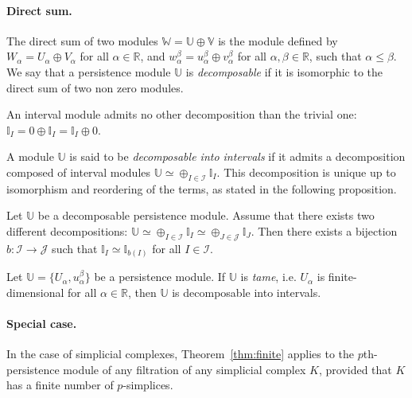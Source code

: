 
\paragraph*{Direct sum.}
The direct sum of two modules $\mathbb{W}=\mathbb{U}\oplus\mathbb{V}$ is the module 
defined by $W_{\alpha}=U_{\alpha}\oplus V_{\alpha}$ for all $\alpha\in\mathbb{R}$, and 
$w_{\alpha}^{\beta}=u_{\alpha}^{\beta}\oplus v_{\alpha}^{\beta}$ for all $\alpha,\beta\in\mathbb{R}$, such that $\alpha\leq\beta$.
 We say that a persistence module $\mathbb{U}$ is \textit{decomposable} if it is isomorphic to the direct sum of two non zero modules.

\begin{prop}
An interval module admits no other decomposition than the trivial one: 
$\mathbb{I}_{I}=0\oplus\mathbb{I}_{I}=\mathbb{I}_{I}\oplus 0$.
\end{prop}

A module $\mathbb{U}$ is said to be \textit{decomposable into intervals} if it admits a decomposition composed of 
interval modules $\mathbb{U}\simeq\oplus_{I\in \mathcal I}\mathbb{I}_{I}$.
This decomposition is unique up to isomorphism and reordering of the terms, as stated in the following proposition.

\begin{prop}
Let $\mathbb{U}$ be a decomposable persistence module. Assume that there exists two 
different decompositions: $\mathbb{U}\simeq\oplus_{I\in \mathcal I}\mathbb{I}_{I}\simeq\oplus_{J\in \mathcal J}\mathbb{I}_{J}$. 
Then there exists a bijection $b:\mathcal I\rightarrow \mathcal J$ such that $\mathbb{I}_I\simeq \mathbb{I}_{b(I)}$ for all $I\in \mathcal I$. 
\end{prop}



\begin{thm}\label{thm:finite} 
Let $\mathbb{U}=\{U_\alpha,u_\alpha^\beta\}$ be a persistence module. If $\mathbb{U}$ is {\em tame}, i.e.
$U_{\alpha}$ is finite-dimensional for all $\alpha\in\mathbb{R}$, 
then $\mathbb{U}$ is decomposable into intervals.
\end{thm}

\paragraph*{Special case.}
In the case of simplicial complexes, Theorem~\ref{thm:finite} applies to the $p$th-persistence module of any 
filtration of any simplicial complex $K$, %
provided that $K$ has a finite number of $p$-simplices.

